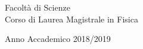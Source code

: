 \documentclass[
12pt, %
english, %
onehalfspacing, %
nohyperref, %
headsepline, %
]{MastersDoctoralThesis} %
\begin{document}
\begin{titlepage}
\begin{center}
\vfill

Facoltà di Scienze\\Corso di Laurea Magistrale in Fisica\\[2cm]
 
\vfill

{\large Anno Accademico 2018/2019}\\[4cm] %
 
\vfill
\end{center}
\end{titlepage}







\end{document}
